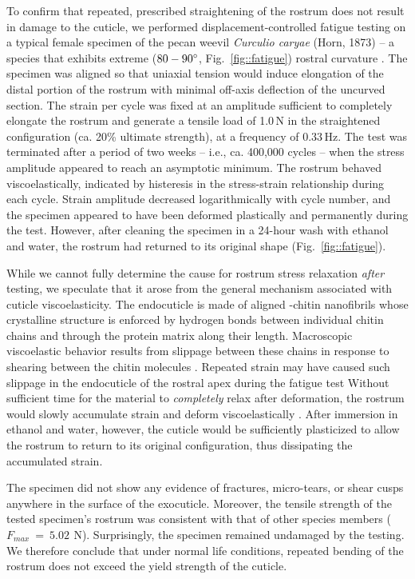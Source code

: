 \documentclass[twocolumn, linenumbers, superscriptaddress, nofootinbib]{revtex4-1}
\begin{document}
		To confirm that repeated, prescribed straightening of the rostrum does not result in damage to the cuticle, we performed displacement-controlled fatigue testing on a typical female specimen of the pecan weevil \textit{Curculio caryae} (Horn, 1873) -- a species that exhibits extreme ($80-90\degree$, Fig.~\ref{fig::fatigue}) rostral curvature \cite{AguirreUribe1978, Gibson1969}.
		The specimen was aligned so that uniaxial tension would induce elongation of the distal portion of the rostrum with minimal off-axis deflection of the uncurved section.
		The strain per cycle was fixed at an amplitude sufficient to completely elongate the rostrum and generate a tensile load of 1.0\,N  in the straightened configuration (ca. 20\% ultimate strength), at a frequency of $0.33\,\text{Hz}$.
		The test was terminated after a period of two weeks -- i.e., ca. 400,000 cycles -- when the stress amplitude appeared to reach an asymptotic minimum.		
		The rostrum behaved viscoelastically, indicated by histeresis in the stress-strain relationship during each cycle.
		Strain amplitude decreased logarithmically with cycle number, and the specimen appeared to have been deformed plastically and permanently during the test.
		However, after cleaning the specimen in a 24-hour wash with ethanol and water, the rostrum had returned to its original shape (Fig.~\ref{fig::fatigue}).
		
		While we cannot fully determine the cause for rostrum stress relaxation \emph{after} testing, we speculate that it arose from the general mechanism associated with cuticle viscoelasticity.
		The endocuticle is made of aligned \textalpha-chitin nanofibrils whose crystalline structure is enforced by hydrogen bonds between individual chitin chains and through the protein matrix along their length.
		Macroscopic viscoelastic behavior results from slippage between these chains in response to shearing between the chitin molecules \cite{Vincent2004, Evans1967, Sun2012}.
		Repeated strain may have caused such slippage in the endocuticle of the rostral apex during the fatigue test
		Without sufficient time for the material to \textit{completely} relax after deformation, the rostrum would slowly accumulate strain and deform viscoelastically \cite{Munster2013}.
		After immersion in ethanol and water, however, the cuticle would be sufficiently plasticized to allow the rostrum to return to its original configuration, thus dissipating the accumulated strain.
		
		The specimen did not show any evidence of fractures, micro-tears, or shear cusps anywhere in the surface of the exocuticle.
		Moreover, the tensile strength of the tested specimen's rostrum was consistent with that of other species members ($F_{max}~=~5.02~\,\text{N}$).
		Surprisingly, the specimen remained undamaged by the testing.
		We therefore conclude that under normal life conditions, repeated bending of the rostrum does not exceed the yield strength of the cuticle.
			
\end{document}
